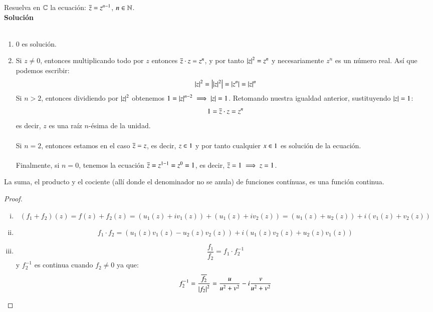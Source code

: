     \begin{ex}[H2.15]\label{eg:2.15}
        Resuelva en $\mathbb{C}$ la ecuación: $\overline{z} = z^{n-1}$, $n\in \mathbb{N}$.\\

        \textbf{Solución}\\\\
        \begin{enumerate}[1)]
            \item $0$ es solución.
            \item Si $z \neq 0$, entonces multiplicando todo por $z$ entonces $\overline{z} \cdot z = z^n$, y por tanto $\left|z\right|^2 = z^n$ y necesariamente $z^n$ es un número real. Así que podemos escribir:
            $$
                \left|z\right|^2 = \left| \left|z\right|^2 \right| = \left|z^n\right| = \left|z\right|^n
            $$
            Si $n > 2$, entonces dividiendo por $\left|z\right|^2$ obtenemos $1 = \left|z\right|^{n-2} \implies \left|z\right| = 1$. Retomando nuestra igualdad anterior, sustituyendo $\left|z\right|=1$:
            $$
                1 = \overline{z} \cdot z = z^n
            $$
            es decir, $z$ es una raíz $n$-ésima de la unidad.\\\\
            Si $n=2$, entonces estamos en el caso $\overline{z} = z$, es decir, $z \in 1$ y por tanto cualquier $x \in 1$ es solución de la ecuación.\\\\
            Finalmente, si $n = 0$, tenemos la ecuación $\overline{z} = z^{1-1} = z^0 = 1$, es decir, $\overline{z} = 1 \implies z = 1$.
        \end{enumerate}
    \end{ex}

    \begin{pro}
        La suma, el producto y el cociente (allí donde el denominador no se anula) de funciones contínuas, es una función continua.
    \end{pro}

    \begin{proof}$ $
        \begin{enumerate}[i)]
            \item $$(f_1+ f_2)(z) = f(z) + f_2(z) = (u_1(z)+iv_1(z)) + (u_1(z) + iv_2(z)) = (u_1(z) + u_2(z)) + i(v_1(z) + v_2(z))$$
            \item
            $$
                f_1 \cdot f_2 = (u_1(z)v_1(z) - u_2(z)v_2(z)) + i(u_1(z)v_2(z) + u_2(z)v_1(z))
            $$
            \item
            $$
                \frac{f_1}{f_2} = f_1 \cdot f_2^{-1}
            $$
            y $f_2^{-1}$ es continua cuando $f_2 \neq 0$ ya que:
            $$
                f_2^{-1} = \frac{\overline{f_2}}{\left|f_2\right|^2} = \frac{u}{u^2+v^2} - i \frac{v}{u^2+v^2}
            $$
        \end{enumerate}
    \end{proof}

